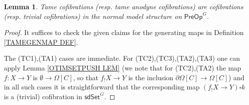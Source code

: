 \documentclass[a4paper,10pt
,draft
]{article}%
\numberwithin{equation}{section}
\numberwithin{figure}{section}
\newtheorem{lemma}[equation]{Lemma}%
\theoremstyle{definition} %
\newcommand{\1}{\ensuremath{\mathbbm 1}}%
\begin{document}
\begin{lemma}\label{TAMECOFCOF_LEM}
	Tame cofibrations (resp. tame anodyne cofibrations) are  cofibrations (resp. trivial cofibrations) in the normal model structure on $\mathsf{PreOp}^G$.
\end{lemma}

\begin{proof}
	It suffices to check the given claims for the generating maps
	in Definition \ref{TAMEGENMAP DEF}.

	The (TC1),(TA1) cases are immediate.
	For (TC2),(TC3),(TA2),(TA3)
	one can apply 
	Lemma \ref{OTIMSETPUSH LEM}
	(we note that for (TC2),(TA2)
	the map $f\colon X \to Y$ is $\emptyset \to \Omega[C]$,
	so that $f_!X \to Y$ is the inclusion
	$\partial \Omega[C] \to \Omega[C]$)
	and in all such cases it is 
	straightforward that the 
	corresponding map $(f_!X \to Y) \square k$
	is a (trivial) cofibration in $\mathsf{sdSet}^G$.
\end{proof}
\end{document}
